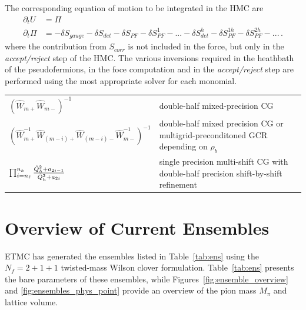 \documentclass[a4paper,11pt]{article}
\begin{document}
The corresponding equation of motion to be integrated in the HMC are
\begin{align*}
    \partial_t U   & =\Pi                \\
    \partial_t \Pi & =-\delta S_{gauge}-
    \delta S_{det} - \delta S_{PF} - \delta S_{PF}^1 -...-
    \delta S^h_{det} -\delta S^{1h}_{PF} - \delta S^{2h}_{PF}-...\,.
\end{align*}
where  the contribution from $S_{corr}$ is not included in the force, but only in the \textit{accept/reject} step of the HMC.
The various inversions required in the heathbath of the pseudofermions, in the foce computation and in the \textit{accept/reject} step are performed using the most appropriate solver for each monomial.
\vspace{1cm}
\begin{tabular}{p{0.3\linewidth}p{0.7\linewidth}}
  \centering $(\hat W_{m+}\hat W_{m-})^{-1}$ & double-half mixed-precision CG \\
  \centering $(\hat W_{m+}^{-1}\hat W_{(m-i)+}\hat W_{(m-i)-}\hat W_{m-}^{-1})^{-1}$ & double-half mixed precision CG or multigrid-preconditoned GCR depending on $\rho_b$ \\
  \centering $\prod_{i=n_\ell}^{n_k} \frac{ \hat{Q}^2_h + a_{2i-1} }{ \hat{Q}^2_h + a_{2i} }$ & single precision multi-shift CG with double-half precision shift-by-shift refinement 
\end{tabular}
   

\section{Overview of Current Ensembles}

ETMC has generated the ensembles listed in Table~\ref{tab:ens} using the \(N_f = 2+1+1\) twisted-mass Wilson clover formulation. Table~\ref{tab:ens} presents the bare parameters of these ensembles, while Figures~\ref{fig:ensemble_overview} and \ref{fig:ensembles_phys_point} provide an overview of the pion mass \(M_\pi\) and lattice volume.  
\end{document}
